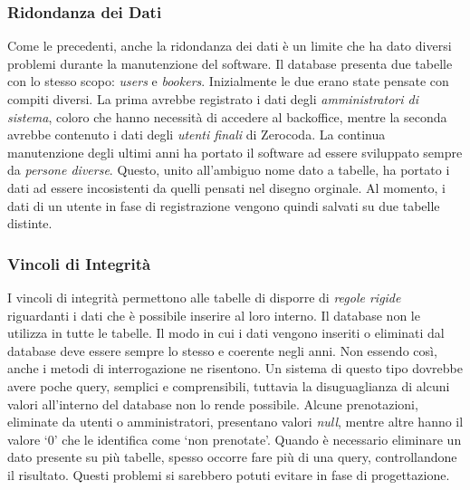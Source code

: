 \subsubsection{Ridondanza dei Dati}
Come le precedenti, anche la ridondanza dei dati è un limite che ha dato diversi problemi durante la manutenzione del software. Il database presenta due tabelle con lo stesso scopo: \textit{users} e \textit{bookers}. Inizialmente le due erano state pensate con compiti diversi. La prima avrebbe registrato i dati degli \emph{amministratori di sistema}, coloro che hanno necessità di accedere al backoffice, mentre la seconda avrebbe contenuto i dati degli \emph{utenti finali} di Zerocoda. La continua manutenzione degli ultimi anni ha portato il software ad essere sviluppato sempre da \textit{persone diverse}. Questo, unito all'ambiguo nome dato a tabelle, ha portato i dati ad essere incosistenti da quelli pensati nel disegno orginale. Al momento, i dati di un utente in fase di registrazione vengono quindi salvati su due tabelle distinte.

\subsubsection{Vincoli di Integrità}
I vincoli di integrità permettono alle tabelle di disporre di \emph{regole rigide} riguardanti i dati che è possibile inserire al loro interno. Il database non le utilizza in tutte le tabelle. Il modo in cui i dati vengono inseriti o eliminati dal database deve essere sempre lo stesso e coerente negli anni. Non essendo così, anche i metodi di interrogazione ne risentono. Un sistema di questo tipo dovrebbe avere poche query, semplici e comprensibili, tuttavia la disuguaglianza di alcuni valori all'interno del database non lo rende possibile. Alcune prenotazioni, eliminate da utenti o amministratori, presentano valori \emph{null}, mentre altre hanno il valore `0' che le identifica come `non prenotate'. Quando è necessario eliminare un dato presente su più tabelle, spesso occorre fare più di una query, controllandone il risultato. Questi problemi si sarebbero potuti evitare in fase di progettazione.
